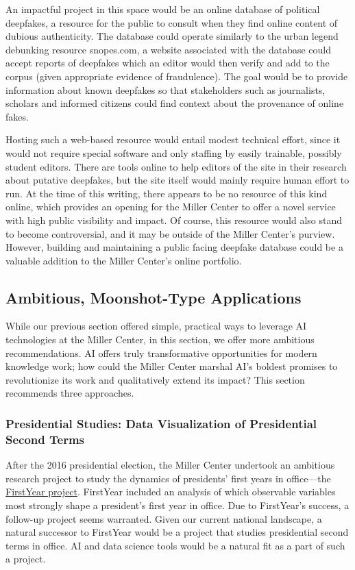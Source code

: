 \documentclass[12pt, oneside]{article}   	%
\begin{document}
An impactful project in this space would be an online database of political deepfakes, a resource for the public to consult when they find online content of dubious authenticity.  The database could operate similarly to the urban legend debunking resource snopes.com, a website associated with the database could accept reports of deepfakes which an editor would then verify and add to the corpus (given appropriate evidence of fraudulence).  The goal would be to provide information about known deepfakes so that stakeholders such as journalists, scholars and informed citizens could find context about the provenance of online fakes.

Hosting such a web-based resource would entail modest technical effort, since it would not require special software and only staffing by easily trainable, possibly student editors.  There are tools online to help editors of the site in their research about putative deepfakes, but the site itself would mainly require human effort to run.  At the time of this writing, there appears to be no resource of this kind online, which provides an opening for the Miller Center to offer a novel service with high public visibility and impact.  Of course, this resource would also stand to become controversial, and it may be outside of the Miller Center’s purview.  However, building and maintaining a public facing deepfake database could be a valuable addition to the Miller Center’s online portfolio. 


\subsection{Ambitious, Moonshot-Type Applications}\label{section.applications.hard}
While our previous section offered simple, practical ways to leverage AI technologies at the Miller Center, in this section, we offer more ambitious recommendations.  AI offers truly transformative opportunities for modern knowledge work; how could the Miller Center marshal AI’s boldest promises to revolutionize its work and qualitatively extend its impact?  This section recommends three approaches.

\subsubsection{Presidential Studies: Data Visualization of Presidential Second Terms}\label{section.applications.hard.dataviz}
After the 2016 presidential election, the Miller Center undertook an ambitious research project to study the dynamics of presidents’ first years in office—the \href{firstyear2017.org}{FirstYear project}.  FirstYear included an analysis of which observable variables most strongly shape a president’s first year in office.  Due to FirstYear’s success, a follow-up project seems warranted.  Given our current national landscape, a natural successor to FirstYear would be a project that studies presidential second terms in office.  AI and data science tools would be a natural fit as a part of such a project.  
\end{document}
